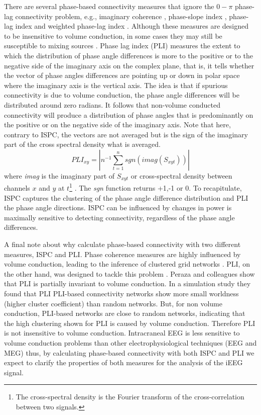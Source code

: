 \documentclass[11pt, onecolumn]{article}
\begin{document}
There are several phase-based connectivity measures that ignore the $0-\pi$ phase-lag
connectivity problem, e.g., imaginary coherence \citep{nolte2004identifying}, phase-slope index \citep{nolte2008robustly}, phase-lag index \citep{stam2007phase} and weighted phase-lag index \cite{vinck2011improved}. Although these measures are designed to be insensitive to volume conduction, in
some cases they may still be susceptible to mixing sources \citep{peraza2012volume}.
Phase lag index (PLI) measures the extent to which the distribution of phase angle differences is more to the positive or to the negative side of the imaginary axis on the complex plane, that is, it tells whether the vector of phase angles differences are pointing up or down in polar space where the imaginary axis is the vertical axis. The idea is that if spurious connectivity is due to volume conduction, the phase angle differences will be distributed around zero radians. It follows that non-volume conducted connectivity will produce a distribution of phase angles that is predominantly on the positive or on the negative side of the imaginary axis. Note that here, contrary to ISPC, the vectors are not averaged but is the sign of the imaginary part of the cross spectral density what is averaged.
\begin{equation}
PLI_{xy} = |n^{-1} \sum_{t=1}^{n}sgn(imag(S_{xyt}))|
\label{eq:pli}
\end{equation}
where \textit{imag} is the imaginary part of $S_{xyt}$ or cross-spectral density between channels $x$ and $y$ at $t$\footnote{The cross-spectral density is the Fourier transform of the cross-correlation between two signals.} \citep{lachaux1999measuring}. The \textit{sgn} function returns +1,-1 or 0. %
To recapitulate, ISPC captures the clustering of the phase angle difference distribution and PLI the phase angle directions. ISPC can be influenced by changes in power is maximally sensitive to detecting connectivity, regardless of the phase angle differences. 

A final note about why calculate phase-based connectivity with two different measures, ISPC and PLI. Phase coherence measures are highly influenced by volume conduction, leading to the inference of clustered grid networks \citep{mormann2000mean}. PLI, on the other hand, was designed to tackle this problem \cite{stam2007phase}. Peraza and colleagues \citep{peraza2012volume} show that PLI is partially invariant to volume conduction. In a simulation study they found that PLI PLI-based connectivity networks show more small worldness (higher cluster coefficient) than random networks. But, for non volume conduction, PLI-based networks are close to random networks, indicating that the high clustering shown for PLI is caused by volume conduction. Therefore PLI is not insensitive to volume conduction. Intracraneal EEG is less sensitive to volume conduction problems than other electrophysiological techniques (EEG and MEG) thus, by calculating phase-based connectivity with both ISPC and PLI we expect to clarify the properties of both measures for the analysis of the iEEG signal.
\end{document}
